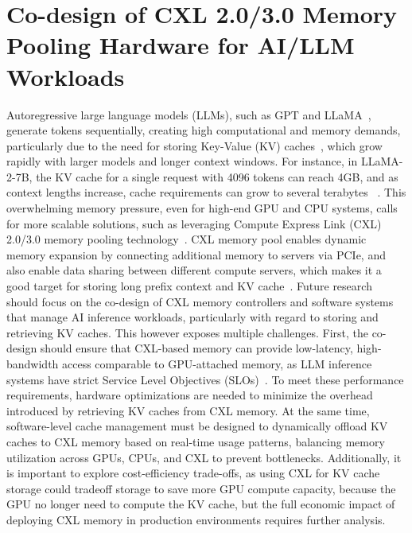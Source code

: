 \section{Co-design of CXL 2.0/3.0 Memory Pooling Hardware for AI/LLM Workloads}
Autoregressive large language models (LLMs), such as GPT and LLaMA~\cite{gpt1, gpt2, gpt3, llama2}, generate tokens sequentially, creating high computational and memory demands, particularly due to the need for storing Key-Value (KV) caches~\cite{pagedattenion, distserve, memserve}, which grow rapidly with larger models and longer context windows. For instance, in LLaMA-2-7B, the KV cache for a single request with 4096 tokens can reach 4GB, and as context lengths increase, cache requirements can grow to several terabytes ~\cite{pagedattenion,liu2023cachegen}. This overwhelming memory pressure, even for high-end GPU and CPU systems, calls for more scalable solutions, such as leveraging Compute Express Link (CXL) 2.0/3.0 memory pooling technology~\cite{pond, cxltradeoff, hybridcxleval}. CXL memory pool enables dynamic memory expansion by connecting additional memory to servers via PCIe, and also enable data sharing between different compute servers, which makes it a good target for storing long prefix context and KV cache~\cite{cacheblend}. Future research should focus on the co-design of CXL memory controllers and software systems that manage AI inference workloads, particularly with regard to storing and retrieving KV caches. This however exposes multiple challenges. First, the co-design should ensure that CXL-based memory can provide low-latency, high-bandwidth access comparable to GPU-attached memory, as LLM inference systems have strict Service Level Objectives (SLOs)~\cite{slo}. To meet these performance requirements, hardware optimizations are needed to minimize the overhead introduced by retrieving KV caches from CXL memory. At the same time, software-level cache management must be designed to dynamically offload KV caches to CXL memory based on real-time usage patterns, balancing memory utilization across GPUs, CPUs, and CXL to prevent bottlenecks. Additionally, it is important to explore cost-efficiency trade-offs, as using CXL for KV cache storage could tradeoff storage to save more GPU compute capacity, because the GPU no longer need to compute the KV cache, but the full economic impact of deploying CXL memory in production environments requires further analysis.

